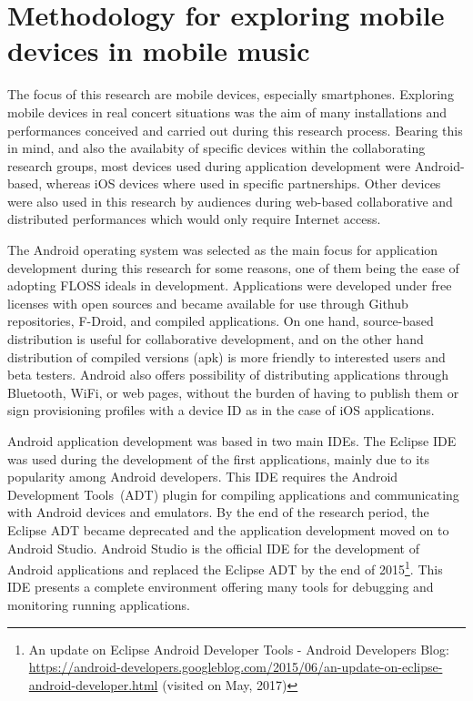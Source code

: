 \section{Methodology for exploring mobile devices in mobile music}

The focus of this research are mobile devices, especially smartphones.
Exploring mobile devices in real concert situations was the aim of many installations and performances conceived and carried out during this research process.
Bearing this in mind, and also the availabity of specific devices within the collaborating research groups, most devices used during application development were Android-based, whereas iOS devices where used in specific partnerships.
Other devices were also used in this research by audiences during web-based collaborative and distributed performances which would only require Internet access. 

The Android operating system was selected as the main focus for application development during this research for some reasons, one of them being the ease of adopting FLOSS ideals in development.
Applications were developed under free licenses with open sources and became available for use through Github repositories, F-Droid, and compiled applications. On one hand, source-based distribution is useful for collaborative development, and on the other hand distribution of compiled versions (apk) is more friendly to interested users and beta testers.
Android also offers possibility of distributing applications through Bluetooth, WiFi, or web pages, without the burden of having to publish them or sign provisioning profiles with a device ID as in the case of iOS applications.

Android application development was based in two main IDEs.
The Eclipse IDE was used during the development of the first applications, mainly due to its popularity among Android developers.
This IDE requires the Android Development Tools~(ADT) plugin for compiling applications and communicating with Android devices and emulators.
By the end of the research period, the Eclipse ADT became deprecated and the application development moved on to Android Studio.
Android Studio is the official IDE for the development of Android applications and replaced the Eclipse ADT by the end of 2015\footnote{An update on Eclipse Android Developer Tools - Android Developers Blog: \url{https://android-developers.googleblog.com/2015/06/an-update-on-eclipse-android-developer.html} (visited on May, 2017)}.
This IDE presents a complete environment offering many tools for debugging and monitoring running applications.

